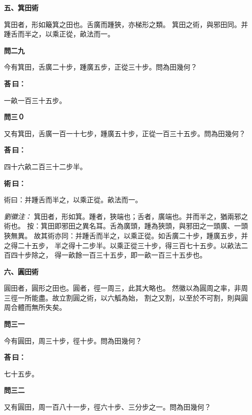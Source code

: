 \documentclass[11pt,a4paper]{article}
\newenvironment{problem}[1][]{%
  \par\vspace{0.6em}\noindent\textcolor{problemcolor}{\textbf{問\ignorespaces#1\unskip}\hspace{0.5em}}%
  \ignorespaces
}{\par\vspace{0.4em}}
\newenvironment{answer}{%
  \par\noindent\textcolor{answercolor}{\textbf{荅\,曰：}}%
  \ignorespaces
}{\par\vspace{0.3em}}
\newenvironment{method}{%
  \par\noindent\textcolor{methodcolor}{\textbf{術\,曰：}}%
  \ignorespaces
}{\par\vspace{0.4em}}
\newenvironment{liuhuicomm}{%
  \par\vspace{0.3em}\noindent\textcolor{commentarycolor}{\small\textit{劉徽注：}}}%
  {\par\vspace{0.5em}}
\begin{document}
\vspace{0.8em}
\noindent\textbf{\large 五、箕田術}
\vspace{0.5em}

\noindent 箕田者，形如簸箕之田也。舌廣而踵狹，亦梯形之類。
箕田之術，與邪田同。并踵舌而半之，以乘正從，畝法而一。

\begin{problem}[二九]
今有箕田，舌廣二十步，踵廣五步，正從三十步。問為田幾何？
\end{problem}

\begin{answer}
一畝一百三十五步。
\end{answer}

\begin{problem}[三０]
又有箕田，舌廣一百一十七步，踵廣五十步，正從一百三十五步。問為田幾何？
\end{problem}

\begin{answer}
四十六畝二百三十二步半。
\end{answer}

\begin{method}
術曰：并踵舌而半之，以乘正從。畝法而一。
\end{method}

\begin{liuhuicomm}
箕田者，形如箕。踵者，狹端也；舌者，廣端也。并而半之，猶兩邪之術也。
按：箕田即邪田之異名耳。舌為廣頭，踵為狹頭，與邪田之一頭廣、一頭狹無異。
故其術亦同：并踵舌而半之，以乘正從。如舌廣二十步，踵廣五步，并之得二十五步，
半之得十二步半。以乘正從三十步，得三百七十五步。以畝法二百四十步除之，
得一畝餘一百三十五步，即一畝一百三十五步也。
\end{liuhuicomm}

\vspace{0.8em}
\noindent\textbf{\large 六、圓田術}
\vspace{0.5em}

\noindent 圓田者，圓形之田也。圓者，徑一周三，此其大略也。
然徽以為圓周之率，非周三徑一所能盡。故立割圓之術，以六觚為始，
割之又割，以至於不可割，則與圓周合體而無所失矣。

\begin{problem}[三一]
今有圓田，周三十步，徑十步。問為田幾何？
\end{problem}

\begin{answer}
七十五步。
\end{answer}

\begin{problem}[三二]
又有圓田，周一百八十一步，徑六十步、三分步之一。問為田幾何？
\end{problem}
\end{document}
